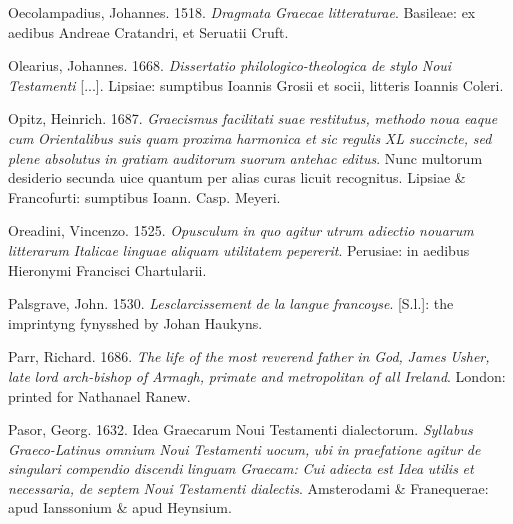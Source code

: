 \documentclass[output=paper]{langsci/langscibook}
\begin{document}
Oecolampadius, Johannes. 1518. \textit{Dragmata} \textit{Graecae} \textit{litteraturae}. Basileae: ex aedibus Andreae Cratandri, et Seruatii Cruft.

Olearius, Johannes. 1668. \textit{Dissertatio} \textit{philologico-theologica} \textit{de} \textit{stylo} \textit{Noui} \textit{Testamenti} [...]. Lipsiae: sumptibus Ioannis Grosii et socii, litteris Ioannis Coleri.

Opitz, Heinrich. 1687. \textit{Graecismus} \textit{facilitati} \textit{suae} \textit{restitutus,} \textit{methodo} \textit{noua} \textit{eaque} \textit{cum} \textit{Orientalibus} \textit{suis} \textit{quam} \textit{proxima} \textit{harmonica} \textit{et} \textit{sic} \textit{regulis} \textit{XL} \textit{succincte,} \textit{sed} \textit{plene} \textit{absolutus} \textit{in} \textit{gratiam} \textit{auditorum} \textit{suorum} \textit{antehac} \textit{editus}. Nunc multorum desiderio secunda uice quantum per alias curas licuit recognitus. Lipsiae \& Francofurti: sumptibus Ioann. Casp. Meyeri.

Oreadini, Vincenzo. 1525. \textit{Opusculum} \textit{in} \textit{quo} \textit{agitur} \textit{utrum} \textit{adiectio} \textit{nouarum} \textit{litterarum} \textit{Italicae} \textit{linguae} \textit{aliquam} \textit{utilitatem} \textit{pepererit}. Perusiae: in aedibus Hieronymi Francisci Chartularii.

Palsgrave, John. 1530. \textit{Lesclarcissement} \textit{de} \textit{la} \textit{langue} \textit{francoyse}. [S.l.]: the imprintyng fynysshed by Johan Haukyns.

Parr, Richard. 1686. \textit{The} \textit{life} \textit{of} \textit{the} \textit{most} \textit{reverend} \textit{father} \textit{in} \textit{God,} \textit{James} \textit{Usher,} \textit{late} \textit{lord} \textit{arch-bishop} \textit{of} \textit{Armagh,} \textit{primate} \textit{and} \textit{metropolitan} \textit{of} \textit{all} \textit{Ireland}. London: printed for Nathanael Ranew.

Pasor, Georg. 1632. Idea Graecarum Noui Testamenti dialectorum. \textit{Syllabus} \textit{Graeco-Latinus} \textit{omnium} \textit{Noui} \textit{Testamenti} \textit{uocum,} \textit{ubi} \textit{in} \textit{praefatione} \textit{agitur} \textit{de} \textit{singulari} \textit{compendio} \textit{discendi} \textit{linguam} \textit{Graecam:} \textit{Cui} \textit{adiecta} \textit{est} \textit{Idea} \textit{utilis} \textit{et} \textit{necessaria,} \textit{de} \textit{septem} \textit{Noui} \textit{Testamenti} \textit{dialectis}. Amsterodami \& Franequerae: apud Ianssonium \& apud Heynsium.
\end{document}
